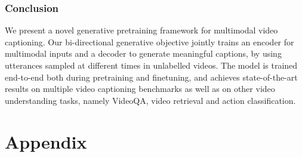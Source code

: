 \documentclass[10pt,twocolumn,letterpaper]{article}
\begin{document}
\begin{table}[t]
    \centering
    \caption{Action classification results on Kinetics with different ViViT initializations. MV-GPT$\dagger$ refers to a model initalised with our MV-GPT pretraining on HowTo100M with \textit{no manually annotated} labels. We use a  factorized encoder ViViT-Base following \cite{arnab2021vivit}, but use a tubelet size of $16\times16\times4$ instead of $16\times16\times2$.}
    \label{tab:kinetics}
    \vspace{-0.3cm}
\end{table}


 \section{Conclusion}
We present a novel generative pretraining framework for multimodal video captioning. Our bi-directional generative objective jointly trains an encoder for multimodal inputs and a decoder to generate meaningful captions, by using utterances sampled at different times in unlabelled videos. The model is trained end-to-end both during pretraining and finetuning, and achieves state-of-the-art results on multiple video captioning benchmarks as well as  on other video understanding tasks, namely VideoQA, video retrieval and action classification. 






 
{\small


}

\clearpage

\appendix

\part{Appendix} 
\end{document}
